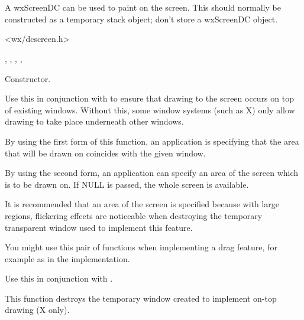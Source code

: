\section{}\label{wxscreendc}

A wxScreenDC can be used to paint on the screen.
This should normally be constructed as a temporary stack object; don't store
a wxScreenDC object.




<wx/dcscreen.h>


, , ,\rtfsp
{}, 




Constructor.

\label{wxscreendcstartdrawingontop}



Use this in conjunction with  to
ensure that drawing to the screen occurs on top of existing windows. Without this,
some window systems (such as X) only allow drawing to take place underneath
other windows.

By using the first form of this function, an application is specifying that
the area that will be drawn on coincides with the given window.

By using the second form, an application can specify an area of the screen
which is to be drawn on. If NULL is passed, the whole screen is available.

It is recommended that an area of the screen is specified because with large regions,
flickering effects are noticeable when destroying the temporary transparent window used
to implement this feature.

You might use this pair of functions when implementing a drag feature, for example
as in the  implementation.

\label{wxscreendcenddrawingontop}


Use this in conjunction with .

This function destroys the temporary window created to implement on-top drawing (X only).

